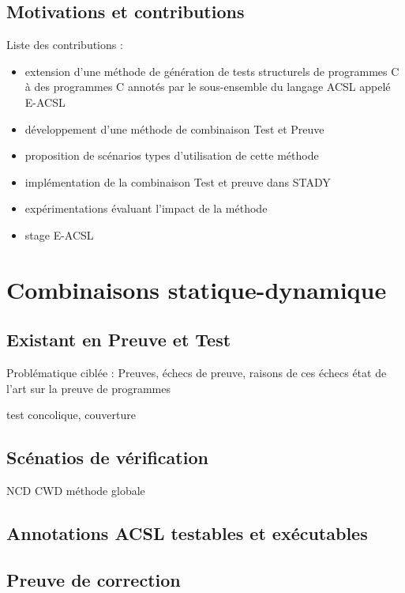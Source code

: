 \documentclass[french]{spimufcphdthesis}
\begin{document}
\chapter{Motivations et contributions}


Liste des contributions :
\begin{itemize}
\item extension d'une méthode de génération de tests structurels de programmes C
  à des programmes C annotés par le sous-ensemble du langage ACSL appelé E-ACSL
\item développement d'une méthode de combinaison Test et Preuve
\item proposition de scénarios types d'utilisation de cette méthode
\item implémentation de la combinaison Test et preuve dans STADY
\item expérimentations évaluant l'impact de la méthode
\item stage E-ACSL
\end{itemize}


\part{Combinaisons statique-dynamique}


\chapter{Existant en Preuve et Test}


Problématique ciblée : Preuves, échecs de
   preuve, raisons de ces échecs état de l'art sur la preuve de programmes
         
         test concolique, couverture


\chapter{Scénatios de vérification}


NCD
CWD
méthode globale


\chapter{Annotations ACSL testables et exécutables}


\chapter{Preuve de correction}
\end{document}
